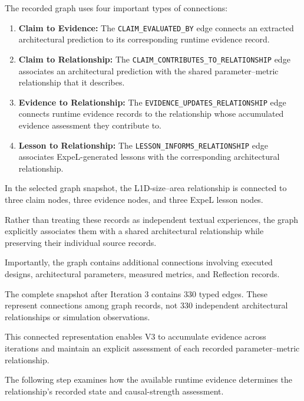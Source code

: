 The recorded graph uses four important
types of connections:

\begin{enumerate}

\item \textbf{Claim to Evidence:}
The \texttt{CLAIM\_EVALUATED\_BY} edge connects
an extracted architectural prediction to
its corresponding runtime evidence record.

\item \textbf{Claim to Relationship:}
The \texttt{CLAIM\_CONTRIBUTES\_TO\_RELATIONSHIP}
edge associates an architectural prediction
with the shared parameter--metric relationship
that it describes.

\item \textbf{Evidence to Relationship:}
The \texttt{EVIDENCE\_UPDATES\_RELATIONSHIP}
edge connects runtime evidence records
to the relationship whose accumulated
evidence assessment they contribute to.

\item \textbf{Lesson to Relationship:}
The \texttt{LESSON\_INFORMS\_RELATIONSHIP}
edge associates ExpeL-generated lessons
with the corresponding architectural
relationship.

\end{enumerate}

In the selected graph snapshot, the
L1D-size--area relationship is connected
to three claim nodes, three evidence
nodes, and three ExpeL lesson nodes.

Rather than treating these records as
independent textual experiences, the graph
explicitly associates them with a shared
architectural relationship while preserving
their individual source records.

Importantly, the graph contains additional
connections involving executed designs,
architectural parameters, measured metrics,
and Reflection records.

The complete snapshot after Iteration 3
contains 330 typed edges. These represent
connections among graph records, not
330 independent architectural relationships
or simulation observations.

This connected representation enables
V3 to accumulate evidence across iterations
and maintain an explicit assessment of
each recorded parameter--metric relationship.

The following step examines how the
available runtime evidence determines
the relationship's recorded state
and causal-strength assessment.


